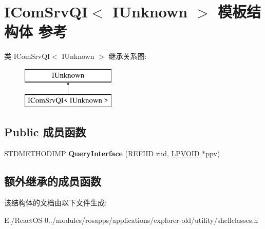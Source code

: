 \hypertarget{struct_i_com_srv_q_i_3_01_i_unknown_01_4}{}\section{I\+Com\+Srv\+QI$<$ I\+Unknown $>$ 模板结构体 参考}
\label{struct_i_com_srv_q_i_3_01_i_unknown_01_4}
类 I\+Com\+Srv\+QI$<$ I\+Unknown $>$ 继承关系图\+:\begin{figure}[H]
\begin{center}
\leavevmode
\includegraphics[height=2.000000cm]{struct_i_com_srv_q_i_3_01_i_unknown_01_4}
\end{center}
\end{figure}
\subsection*{Public 成员函数}
\begin{DoxyCompactItemize}
\item 
\mbox{\label{struct_i_com_srv_q_i_3_01_i_unknown_01_4_a349acd328afbe17ce7e21dd07e8c9b0c}} 
S\+T\+D\+M\+E\+T\+H\+O\+D\+I\+MP {\bfseries Query\+Interface} (R\+E\+F\+I\+ID riid, \hyperlink{interfacevoid}{L\+P\+V\+O\+ID} $\ast$ppv)
\end{DoxyCompactItemize}
\subsection*{额外继承的成员函数}


该结构体的文档由以下文件生成\+:\begin{DoxyCompactItemize}
\item 
E\+:/\+React\+O\+S-\/0../modules/rosapps/applications/explorer-\/old/utility/shellclasses.\+h\end{DoxyCompactItemize}
